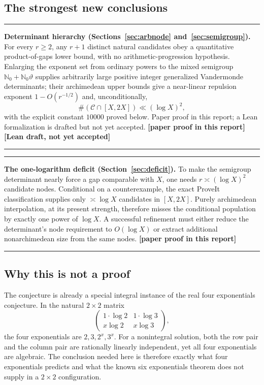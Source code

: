 \documentclass[11pt,oneside]{article}
\theoremstyle{definition}
\theoremstyle{remark}
\newcommand{\Nzero}{\mathbb N_0}
\newcommand{\thetaq}{\vartheta}
\newcommand{\Cand}{\mathcal C}
\newcommand{\statusnew}{\textcolor{newgreen}{\textbf{[paper proof in this report]}}}
\newcommand{\statusdraft}{\textcolor{computeviolet}{\textbf{[Lean draft, not yet accepted]}}}
\newenvironment{resultbox}
{\begin{center}\begin{minipage}{0.94\textwidth}\hrule\vspace{0.45em}}
{\vspace{0.35em}\hrule\end{minipage}\end{center}}
\begin{document}
\subsection{The strongest new conclusions}
\label{ex:newconclusions}

\begin{resultbox}
\textbf{Determinant hierarchy (Sections~\ref{sec:arbnode} and~\ref{sec:semigroup}).}
For every $r\ge2$, any $r+1$ distinct natural candidates obey a quantitative product-of-gaps
lower bound, with no arithmetic-progression hypothesis.  Enlarging the exponent set from
ordinary powers to the mixed semigroup $\Nzero+\Nzero\thetaq$ supplies arbitrarily large
positive integer generalized Vandermonde determinants; their archimedean upper bounds give a
near-linear repulsion exponent $1-O(r^{-1/2})$ and, unconditionally,
\[
  \#(\Cand\cap[X,2X])\ll(\log X)^2,
\]
with the explicit constant $10000$ proved below.  Paper proof in this report; a Lean
formalization is drafted but not yet accepted.  \statusnew{} \statusdraft
\end{resultbox}

\begin{resultbox}
\textbf{The one-logarithm deficit (Section~\ref{sec:deficit}).}
To make the semigroup determinant nearly force a gap comparable with $X$, one needs
$r\asymp(\log X)^2$ candidate nodes.  Conditional on a counterexample, the exact ProveIt
classification supplies only $\asymp\log X$ candidates in $[X,2X]$.  Purely archimedean
interpolation, at its present strength, therefore misses the conditional population by exactly
one power of $\log X$.  A successful refinement must either reduce the determinant's node
requirement to $O(\!\log X)$ or extract additional nonarchimedean size from the same nodes.
\statusnew
\end{resultbox}

\subsection{Why this is not a proof}
\label{ex:notproof}

The conjecture is already a special integral instance of the real four exponentials
conjecture.  In the natural $2\times2$ matrix
\[
  \begin{pmatrix}
   1\cdot\log2 & 1\cdot\log3\\
   x\log2 & x\log3
  \end{pmatrix},
\]
the four exponentials are $2,3,2^x,3^x$.  For a nonintegral solution, both the row pair and
the column pair are rationally linearly independent, yet all four exponentials are algebraic.
The conclusion needed here is therefore exactly what four exponentials predicts and what the
known six exponentials theorem does not supply in a $2\times2$ configuration.
\end{document}

